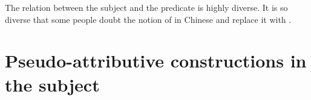 The relation between the subject and the predicate is highly diverse.
It is so diverse that some people doubt the notion of  in Chinese and replace it with . %

\section{Pseudo-attributive constructions in the subject}

